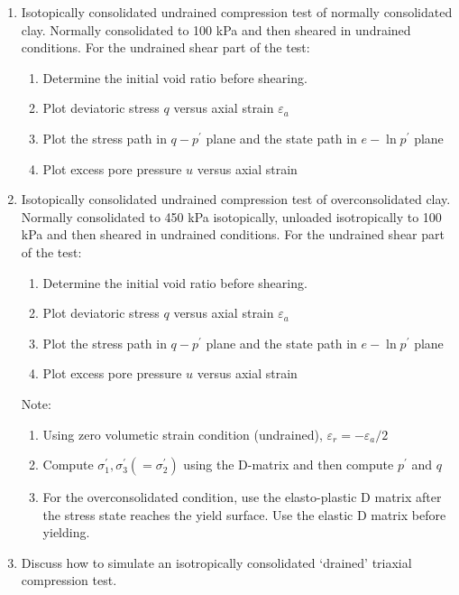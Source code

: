 \documentclass[a4paper,12pt]{article}
\begin{document}
\begin{enumerate}
	\item Isotopically consolidated undrained compression test of normally consolidated clay.
	Normally consolidated to 100 kPa and then sheared in undrained conditions. For the undrained shear part of the test:
	\begin{enumerate}
		\item Determine the initial void ratio before shearing.
		\item Plot deviatoric stress $q$ versus axial strain $\varepsilon_a$
		\item Plot the stress path in $q-p^\prime$ plane and the state path in $e - \ln p^\prime$ plane
		\item Plot excess pore pressure $u$ versus axial strain
	\end{enumerate}

	\item Isotopically consolidated undrained compression test of overconsolidated clay.
	Normally consolidated to 450 kPa isotopically, unloaded isotropically to 100 kPa
	and then sheared in undrained conditions. For the undrained shear part of the test:
	\begin{enumerate}
		\item Determine the initial void ratio before shearing.
		\item Plot deviatoric stress $q$ versus axial strain $\varepsilon_a$
		\item Plot the stress path in $q-p^\prime$ plane and the state path in $e - \ln p^\prime$ plane
		\item Plot excess pore pressure $u$ versus axial strain
	\end{enumerate}
	Note:
	\begin{enumerate}
		\item 	Using zero volumetic strain condition (undrained), $\varepsilon_r = - \varepsilon_a /2$ 
		\item Compute $\sigma_1^\prime, \sigma_3^\prime (=\sigma_2^\prime)$ using the D-matrix and then compute $p^\prime$ and $q$
		\item For the overconsolidated condition, use the elasto-plastic D matrix after the stress
		state reaches the yield surface. Use the elastic D matrix before yielding.
	\end{enumerate}
	\item Discuss how to simulate an isotropically consolidated `drained' triaxial compression test.
		
\end{enumerate}
\end{document}
